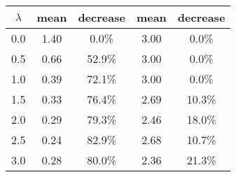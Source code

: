 \begin{tabular}{c||c|c||c|c}
\toprule
 $\lambda$ &  mean & decrease &  mean & decrease \\
\midrule
       0.0 &  1.40 &    0.0\% &  3.00 &    0.0\% \\
       0.5 &  0.66 &   52.9\% &  3.00 &    0.0\% \\
       1.0 &  0.39 &   72.1\% &  3.00 &    0.0\% \\
       1.5 &  0.33 &   76.4\% &  2.69 &   10.3\% \\
       2.0 &  0.29 &   79.3\% &  2.46 &   18.0\% \\
       2.5 &  0.24 &   82.9\% &  2.68 &   10.7\% \\
       3.0 &  0.28 &   80.0\% &  2.36 &   21.3\% \\
\bottomrule
\end{tabular}
